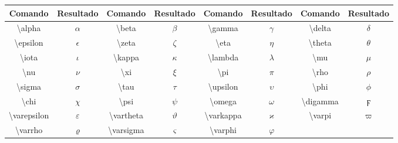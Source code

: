 % 
% 
% 
% 
% 
\begin{tabular}{cc|cc|cc|cc}
    \hline
    Comando & Resultado & Comando & Resultado & Comando & Resultado & Comando & Resultado \\ \hline
    \textbackslash\textsf{alpha} & $\alpha$ & \textbackslash\textsf{beta} & $\beta$ & \textbackslash\textsf{gamma} & $\gamma$ & \textbackslash\textsf{delta} & $\delta$ \\
    \textbackslash\textsf{epsilon} & $\epsilon$ & \textbackslash\textsf{zeta} & $\zeta$ & \textbackslash\textsf{eta} & $\eta$ & \textbackslash\textsf{theta} & $\theta$ \\
    \textbackslash\textsf{iota} & $\iota$ & \textbackslash\textsf{kappa} & $\kappa$ & \textbackslash\textsf{lambda} & $\lambda$ & \textbackslash\textsf{mu} & $\mu$ \\
    \textbackslash\textsf{nu} & $\nu$ & \textbackslash\textsf{xi} & $\xi$ & \textbackslash\textsf{pi} & $\pi$ & \textbackslash\textsf{rho} & $\rho$ \\
    \textbackslash\textsf{sigma} & $\sigma$ & \textbackslash\textsf{tau} & $\tau$ & \textbackslash\textsf{upsilon} & $\upsilon$ & \textbackslash\textsf{phi} & $\phi$ \\
    \textbackslash\textsf{chi} & $\chi$ & \textbackslash\textsf{psi} & $\psi$ & \textbackslash\textsf{omega} & $\omega$ & \textbackslash\textsf{digamma} & $\digamma$ \\
    \textbackslash\textsf{varepsilon} & $\varepsilon$ & \textbackslash\textsf{vartheta} & $\vartheta$ & \textbackslash\textsf{varkappa} & $\varkappa$ & \textbackslash\textsf{varpi} & $\varpi$ \\
    \textbackslash\textsf{varrho} & $\varrho$ & \textbackslash\textsf{varsigma} & $\varsigma$ & \textbackslash\textsf{varphi} & $\varphi$ & & \\ \hline
\end{tabular}
